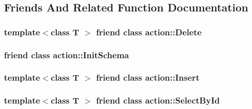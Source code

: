 \subsection{Friends And Related Function Documentation}
\hypertarget{classdbo_1_1connection_ae779179e16547c9a93329dd197385493}{
\subsubsection[{action\+::\+Delete}]{\setlength{\rightskip}{0pt plus 5cm}template$<$class T $>$ friend class {\bf action\+::\+Delete}\hspace{0.3cm}{\ttfamily [friend]}}}\label{classdbo_1_1connection_ae779179e16547c9a93329dd197385493}
\hypertarget{classdbo_1_1connection_af0423915055bedb88a9d6d44bd6d7d86}{
\subsubsection[{action\+::\+Init\+Schema}]{\setlength{\rightskip}{0pt plus 5cm}friend class {\bf action\+::\+Init\+Schema}\hspace{0.3cm}{\ttfamily [friend]}}}\label{classdbo_1_1connection_af0423915055bedb88a9d6d44bd6d7d86}
\hypertarget{classdbo_1_1connection_a88a9b73e2cb3304941371508b660e53e}{
\subsubsection[{action\+::\+Insert}]{\setlength{\rightskip}{0pt plus 5cm}template$<$class T $>$ friend class {\bf action\+::\+Insert}\hspace{0.3cm}{\ttfamily [friend]}}}\label{classdbo_1_1connection_a88a9b73e2cb3304941371508b660e53e}
\hypertarget{classdbo_1_1connection_a8b98481706995f8b3e2665f74b2b3039}{
\subsubsection[{action\+::\+Select\+By\+Id}]{\setlength{\rightskip}{0pt plus 5cm}template$<$class T $>$ friend class {\bf action\+::\+Select\+By\+Id}\hspace{0.3cm}{\ttfamily [friend]}}}\label{classdbo_1_1connection_a8b98481706995f8b3e2665f74b2b3039}
